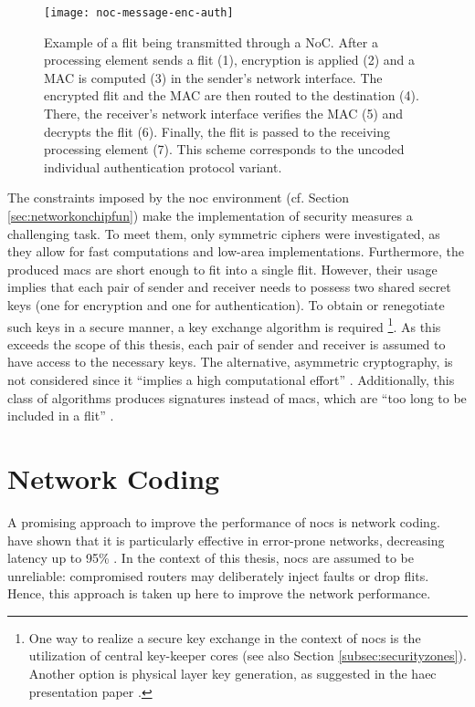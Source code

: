 \begin{figure}
    \centering
    \texttt{[image: noc-message-enc-auth]}
    \caption[Flit in the NoC with encryption and authentication]{Example of a flit being transmitted through a NoC. After a processing element sends a flit (1),
    encryption is applied (2) and a MAC is computed (3) in the sender's network interface. The encrypted flit and the MAC are then routed to the
    destination (4). There, the receiver's network interface verifies the MAC (5) and decrypts the flit (6). Finally, the flit is passed to the
    receiving processing element (7). This scheme corresponds to the uncoded individual authentication protocol variant.}
    \label{fig:nocflitencauth}
\end{figure}

The constraints imposed by the \gls{noc} environment (cf. Section \ref{sec:networkonchipfun}) make the implementation of security measures a
challenging task. To meet them, only symmetric ciphers were investigated, as they allow for fast computations and low-area implementations.
Furthermore, the produced \glspl{mac} are short enough to fit into a single flit. However, their usage implies that each pair of
sender and receiver needs to possess two shared secret keys (one for encryption and one for authentication). To obtain or renegotiate
such keys in a secure manner, a key exchange algorithm is required
\footnote{One way to realize a secure key exchange in the context of \glspl{noc} is the utilization of central key-keeper cores
\cite{gebotys03securityframework} (see also Section \ref{subsec:securityzones}). Another option is physical layer key generation, as suggested in the
\gls{haec} presentation paper \cite[4]{matthiesen17haec}.}.
As this exceeds the scope of this thesis, each pair of sender and receiver is assumed to have access to the necessary keys. The alternative, asymmetric
cryptography, is not considered since it \enquote{implies a high computational effort} \cite[3]{moriam18activeattackers}. Additionally, this class of
algorithms produces signatures instead of \glspl{mac}, which are \enquote{too long to be included in a flit} \cite[3]{moriam18activeattackers}.

\section{Network Coding}\label{sec:networkcodingover}
A promising approach to improve the performance of \glspl{noc} is network coding. \citeauthor{moriam15manycorenc} have shown that it is particularly
effective in error-prone networks, decreasing latency up to 95\% \cite[7]{moriam15manycorenc}. In the context of this thesis, \glspl{noc} are assumed
to be unreliable: compromised routers may deliberately inject faults or drop flits. Hence, this approach is taken up here to improve the network
performance.

